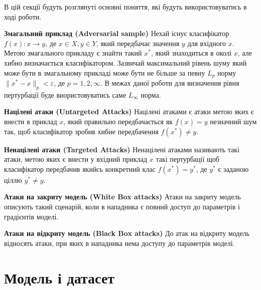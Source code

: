 \documentclass[a4paper,12pt]{extreport}
\begin{document}
	В цій секції будуть розглянуті основні поняття, які будуть використовуватись в ході роботи. 
	
	\textbf{Змагальний приклад (Adversarial sample)}
	\newline
	Нехай існує класифікатор $f(x):x\rightarrow y$, де  $x \in X, y \in Y$, який передбачає значення $y$ для вхідного $x$. Метою змагального прикладу є знайти такий $x^{*}$, який знаходиться в околі $x$, але хибно визначається класифікатором. Зазвичай максимальний рівень шуму який може бути в змагальному прикладі може бути не більше за певну $L_p$ норму $ \| x^{*} - x \|_p < \varepsilon $, де $p=1,2,\infty $. В межах даної роботи для визначення рівня пертурбації буде виористовуватись саме $L_{\infty}$ норма.
	\par
	\textbf{Націлені атаки (Untargeted Attacks)} \newline
	Націлені атаками є атаки метою яких є внести в приклад $x$, який правильно передбачається як $f(x) = y$ незначний шум так, щоб класифікатор зробив хибне передбачення $f(x^{*}) \neq y$.
	\par
	\textbf{Ненацілені атаки (Targeted Attacks)} \newline
	Ненацілені атаками називають такі атаки, метою яких є внести у вхідний приклад $x$ такі пертурбації щоб класифікатор передбачив якийсь конкретний клас $f(x^{*}) = y^{*}$, де $y^{*}$ є заданою ціллю $y^{*} \neq y$.
	\par
	\textbf{Атаки на закриту модель (White Box attacks)} \newline
	Атаки на закриту модель описують такий сценарій, коли в нападника є повний доступ до параметрів і градієнтів моделі.
	\par
	\textbf{Атаки на відкриту модель (Black Box attacks)} \newline
	До атак на відкриту модель відносять атаки, при яких в нападника нема доступу до параметрів моделі. 

	\chapter{Модель і датасет}
	
\end{document}
